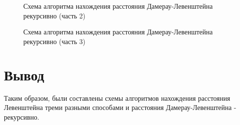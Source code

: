 \begin{figure}[p]
	\caption{Схема алгоритма нахождения расстояния Дамерау-Левенштейна рекурсивно (часть 2)}
	\label{img_dam_2}
\end{figure}
\begin{figure}[p]
	\caption{Схема алгоритма нахождения расстояния Дамерау-Левенштейна рекурсивно (часть 3)}
	\label{img_dam_3}
\end{figure}
\newpage

\section{Вывод}
Таким образом, были составлены схемы алгоритмов нахождения расстояния Левенштейна треми разными способами и расстояния Дамерау-Левенштейна - рекурсивно.
